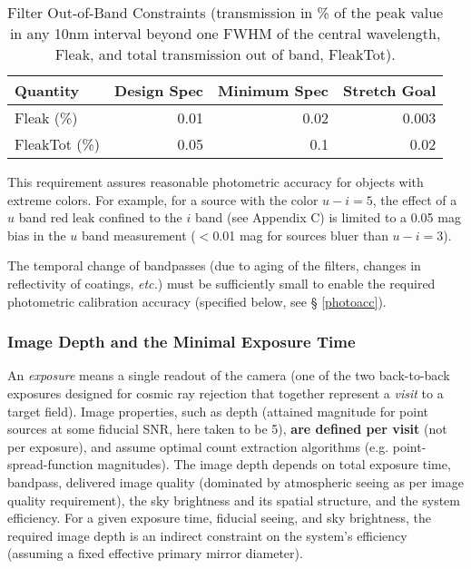 \begin{table}[h]
\begin{tabular}{|l|r|r|r|}
\hline
Quantity    & Design Spec & Minimum Spec & Stretch Goal        \\
\hline
 Fleak (\%)      &      0.01      &      0.02   &       0.003     \\
 FleakTot (\%)   &      0.05      &      0.1    &       0.02      \\
\hline
\end{tabular}
\caption{Filter Out-of-Band Constraints (transmission in \% of the peak
value in any 10nm interval beyond one FWHM of the central wavelength,
Fleak, and total transmission out of band, FleakTot).}
\label{Tleaks}
\end{table}

This requirement assures reasonable photometric accuracy for objects with
extreme colors. For example, for a source with the color $u-i=5$, the
effect of a $u$ band red leak confined to the $i$ band (\eg see Appendix
C) is limited to a 0.05 mag bias in the $u$ band measurement ($<$0.01 mag
for sources bluer than $u-i=3$).

The temporal change of bandpasses (due to aging of the filters, changes in
reflectivity of coatings, {\it etc.}) must be sufficiently small to enable
the required photometric calibration accuracy (specified below, see \S
\ref{photoacc}).



\subsubsection{Image Depth and the Minimal Exposure Time}

An {\it exposure} means a single readout of the camera (one of the two
back-to-back exposures designed for cosmic ray rejection that together
represent a {\it visit} to a target field).  Image properties, such as
depth (attained magnitude for point sources at some fiducial SNR, here
taken to be 5), {\bf are defined per visit} (not per exposure), and assume optimal
count extraction algorithms (e.g. point-spread-function magnitudes). The image
depth depends on total exposure time, bandpass, delivered image quality
(dominated by atmospheric seeing as per image quality requirement), the sky
brightness and its spatial structure, and the system efficiency. For a
given exposure time, fiducial seeing, and sky brightness, the required
image depth is an indirect constraint on the system's efficiency (assuming
a fixed effective primary mirror diameter).


